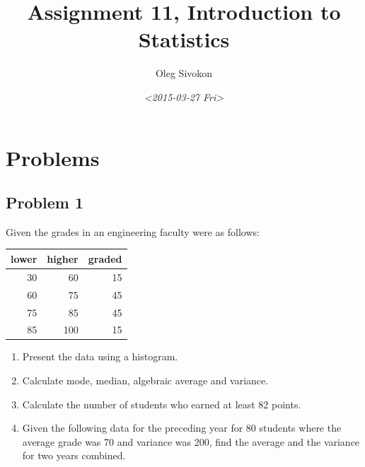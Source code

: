 \documentclass[11pt]{article}
\author{Oleg Sivokon}
\date{\textit{<2015-03-27 Fri>}}
\title{Assignment 11, Introduction to Statistics}
\begin{document}
\maketitle
\tableofcontents



\clearpage

\section{Problems}
\label{sec-1}

\subsection{Problem 1}
\label{sec-1-1}
Given the grades in an engineering faculty were as follows:

\begin{center}
\begin{tabular}{rrr}
lower & higher & graded\\
\hline
30 & 60 & 15\\
60 & 75 & 45\\
75 & 85 & 45\\
85 & 100 & 15\\
\end{tabular}
\end{center}

\begin{enumerate}
\item Present the data using a histogram.
\item Calculate mode, median, algebraic average and variance.
\item Calculate the number of students who earned at least 82 points.
\item Given the following data for the preceding year for 80 students
where the average grade was 70 and variance was 200, find the
average and the variance for two years combined.
\end{enumerate}
\end{document}
